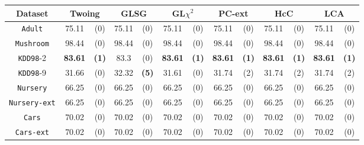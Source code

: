 \begin{table}
\small
\centering
\begin{tabular}{c|cc|cc|cc|cc|cc|cc} 
Dataset             & \multicolumn{2}{c|}{Twoing} &  \multicolumn{2}{c|}{GLSG}  & \multicolumn{2}{c|}{GL$\chi^2$} & \multicolumn{2}{c|}{PC-ext}& \multicolumn{2}{c|}{HcC} & \multicolumn{2}{c}{LCA} \\
\hline
{\tt Adult}         &  75.11       & (0)          &  75.11       & (0)          &  75.11       & (0)              & 75.11      & (0)           & 75.11      & (0)        & 75.11      & (0)        \\
{\tt Mushroom}      &  98.44       & (0)          &  98.44       & (0)          &  98.44       & (0)              & 98.44      & (0)           & 98.44      & (0)        & 98.44      & (0)        \\
{\tt KDD98}-2       &  {\bf 83.61} & {\bf (1)}    &  83.3        & (0)          &  {\bf 83.61} & {\bf (1)}        &{\bf 83.61} & {\bf (1)}     & {\bf 83.61}& {\bf (1)}  & {\bf 83.61}& {\bf (1)}  \\
{\tt KDD98}-9       &  31.66       & (0)          &  32.32       & {\bf (5)}    &  31.61       & (0)              & 31.74      & (2)           & 31.74      & (2)        & 31.74       & (2)       \\
{\tt Nursery}       &  66.25       & (0)          &  66.25       & (0)          &  66.25       & (0)              & 66.25      & (0)           & 66.25      & (0)        & 66.25       & (0)       \\
{\tt Nursery-ext}   &  66.25       & (0)          &  66.25       & (0)          &  66.25       & (0)              & 66.25      & (0)           & 66.25      & (0)        & 66.25       & (0)       \\
{\tt Cars}          &  70.02       & (0)          &  70.02       & (0)          &  70.02       & (0)              & 70.02      & (0)           & 70.02      & (0)        & 70.02       & (0)       \\
{\tt Cars-ext}      &  70.02       & (0)          &  70.02       & (0)          &  70.02       & (0)              & 70.02      & (0)           & 70.02      & (0)        & 70.02       & (0)       \\

\end{tabular}
\end{table}
